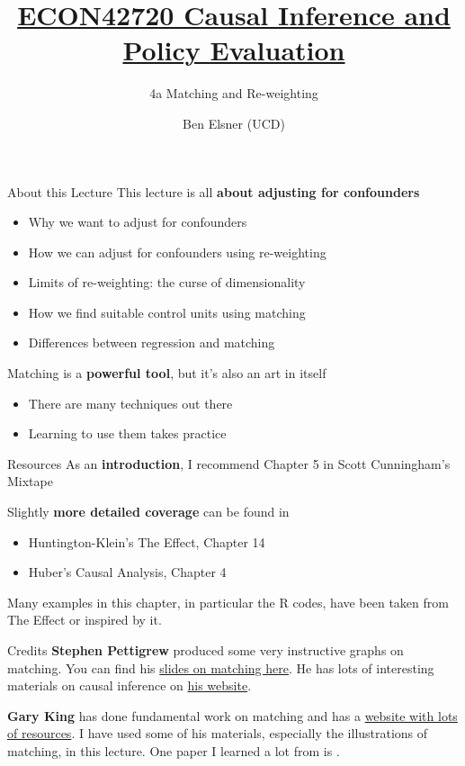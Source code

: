 \documentclass[
  ignorenonframetext,
  aspectratio=169, handout]{beamer}
\title{\href{https://benelsner82.github.io/causalinfUCD/}{ECON42720
Causal Inference and Policy Evaluation}}
\subtitle{4a Matching and Re-weighting}
\author{Ben Elsner (UCD)}
\date{}
\providecommand{\tightlist}{%
  \setlength{\itemsep}{0pt}\setlength{\parskip}{0pt}}
\newcommand{\brf}[1]{\textcolor{brickred}{\textbf{#1}}}
\begin{document}
\frame{\titlepage}

\begin{frame}{About this Lecture}
\protect\hypertarget{about-this-lecture}{}
This lecture is all \brf{about adjusting for confounders}

\begin{itemize}
\tightlist
\item
  Why we want to adjust for confounders
\item
  How we can adjust for confounders using re-weighting
\item
  Limits of re-weighting: the curse of dimensionality
\item
  How we find suitable control units using matching
\item
  Differences between regression and matching
\end{itemize}

\vfill

Matching is a \brf{powerful tool}, but it's also an art in itself

\begin{itemize}
\tightlist
\item
  There are many techniques out there
\item
  Learning to use them takes practice
\end{itemize}
\end{frame}

\begin{frame}{Resources}
\protect\hypertarget{resources}{}
As an \brf{introduction}, I recommend Chapter 5 in Scott Cunningham's
Mixtape

\vfill

Slightly \brf{more detailed coverage} can be found in

\begin{itemize}
\tightlist
\item
  Huntington-Klein's The Effect, Chapter 14
\item
  Huber's Causal Analysis, Chapter 4
\end{itemize}

\vfill

Many examples in this chapter, in particular the R codes, have been
taken from The Effect or inspired by it.
\end{frame}

\begin{frame}{Credits}
\protect\hypertarget{credits}{}
\brf{Stephen Pettigrew} produced some very instructive graphs on
matching. You can find his
\href{https://www.stephenpettigrew.com/teaching/gov2001/section11_2014.pdf}{slides
on matching here}. He has lots of interesting materials on causal
inference on \href{https://www.stephenpettigrew.com/}{his website}.

\vfill

\brf{Gary King} has done fundamental work on matching and has a
\href{https://gking.harvard.edu/}{website with lots of resources}. I
have used some of his materials, especially the illustrations of
matching, in this lecture. One paper I learned a lot from is
\citet{ho_2007}.
\end{frame}
\end{document}
